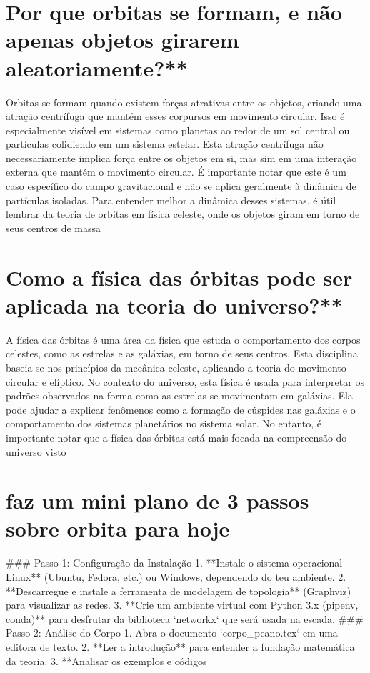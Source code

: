 \documentclass[11pt,a4paper]{article}
\begin{document}
\section{Por que orbitas se formam, e não apenas objetos girarem aleatoriamente?**}
Orbitas se formam quando existem forças atrativas entre os objetos, criando uma atração centrífuga que mantém esses corpursos em movimento circular. Isso é especialmente visível em sistemas como planetas ao redor de um sol central ou partículas colidiendo em um sistema estelar. Esta atração centrífuga não necessariamente implica força entre os objetos em si, mas sim em uma interação externa que mantém o movimento circular. É importante notar que este é um caso específico do campo gravitacional e não se aplica geralmente à dinâmica de partículas isoladas. Para entender melhor a dinâmica desses sistemas, é útil lembrar da teoria de orbitas em física celeste, onde os objetos giram em torno de seus centros de massa

\section{Como a física das órbitas pode ser aplicada na teoria do universo?**}
A física das órbitas é uma área da física que estuda o comportamento dos corpos celestes, como as estrelas e as galáxias, em torno de seus centros. Esta disciplina baseia-se nos princípios da mecânica celeste, aplicando a teoria do movimento circular e elíptico. No contexto do universo, esta física é usada para interpretar os padrões observados na forma como as estrelas se movimentam em galáxias. Ela pode ajudar a explicar fenômenos como a formação de cúspides nas galáxias e o comportamento dos sistemas planetários no sistema solar. No entanto, é importante notar que a física das órbitas está mais focada na compreensão do universo visto

\section{faz um mini plano de 3 passos sobre orbita para hoje}
\#\#\# Passo 1: Configuração da Instalação 1. **Instale o sistema operacional Linux** (Ubuntu, Fedora, etc.) ou Windows, dependendo do teu ambiente. 2. **Descarregue e instale a ferramenta de modelagem de topologia** (Graphviz) para visualizar as redes. 3. **Crie um ambiente virtual com Python 3.x (pipenv, conda)** para desfrutar da biblioteca `networkx` que será usada na escada. \#\#\# Passo 2: Análise do Corpo 1. Abra o documento `corpo\_peano.tex` em uma editora de texto. 2. **Ler a introdução** para entender a fundação matemática da teoria. 3. **Analisar os exemplos e códigos
\end{document}
